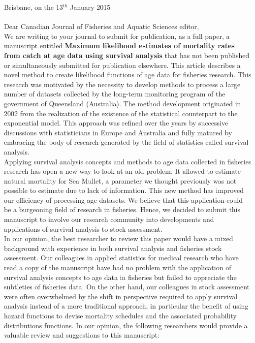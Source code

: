 \documentclass[11pt]{article}
\begin{document}
\begin{spacing}{1.2} 
\hspace{9cm} Brisbane, on the 13$^{th}$ January 2015\\ \\

\noindent Dear Canadian Journal of Fisheries and Aquatic Sciences editor, \\ 

\noindent We are writing to your journal to submit for publication, as a full paper, a manuscript entitled {\bf Maximum likelihood estimates of mortality rates from catch at age data using survival analysis} that has not been published or simultaneously submitted for publication elsewhere. This article describes a novel method to create likelihood functions of age data for fisheries research. This research was motivated by the necessity to develop methods to process a large number of datasets collected by the long-term monitoring program of the government of Queensland (Australia). The method development originated in 2002 from the realization of the existence of the statistical counterpart to the exponential model. This approach was refined over the years by successive discussions with statisticians in Europe and Australia and fully matured by embracing the body of research generated by the field of statistics called survival analysis. \\

Applying survival analysis concepts and methods to age data collected in fisheries research has open a new way to look at an old problem. It allowed to estimate natural mortality for Sea Mullet, a parameter we thought previously was not possible to estimate due to lack of information. This new method has improved our efficiency of processing age datasets. We believe that this application could be a burgeoning field of research in fisheries. Hence, we decided to submit this manuscript to involve our research community into developments and applications of survival analysis to stock assessment. \\

In our opinion, the best researcher to review this paper would have a mixed background with experience in both survival analysis and fisheries stock assessment. Our colleagues in applied statistics for medical research who have read a copy of the manuscript have had no problem with the application of survival analysis concepts to age data in fisheries but failed to appreciate the subtleties of fisheries data. On the other hand, our colleagues in stock assessment were often overwhelmed by the shift in perspective required to apply survival analysis instead of a more traditional approach, in particular the benefit of using hazard functions to devise mortality schedules and the associated probability distributions functions. In our opinion, the following researchers would provide a valuable review and suggestions to this manuscript:


\end{spacing}
\end{document}
